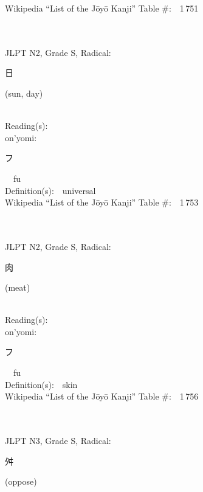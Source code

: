 \begin{multicols}{2}
Wikipedia ``List of the J\=oy\=o Kanji'' Table \#:\ \ 1\,751 \\
\ \ \\
{\fontsize{34pt}{40pt}  }\ \ \\  %
{JLPT N2, Grade S, Radical:\ \ {\begin{CJK}{UTF8}{min} 日 \end{CJK}} (sun, day) } \\
Reading(s):\ \ \\
{\hspace*{1em}}on'yomi:\ \ \\
{\hspace*{2em}}{\begin{CJK}{UTF8}{min} フ \end{CJK}}\ \ fu\ \ \\
Definition(s):\ \ universal \\
Wikipedia ``List of the J\=oy\=o Kanji'' Table \#:\ \ 1\,753 \\
\ \ \\
{\fontsize{34pt}{40pt}  }\ \ \\  %
{JLPT N2, Grade S, Radical:\ \ {\begin{CJK}{UTF8}{min} 肉 \end{CJK}} (meat) } \\
Reading(s):\ \ \\
{\hspace*{1em}}on'yomi:\ \ \\
{\hspace*{2em}}{\begin{CJK}{UTF8}{min} フ \end{CJK}}\ \ fu\ \ \\
Definition(s):\ \ skin \\
Wikipedia ``List of the J\=oy\=o Kanji'' Table \#:\ \ 1\,756 \\
\ \ \\
{\fontsize{34pt}{40pt}  }\ \ \\  %
{JLPT N3, Grade S, Radical:\ \ {\begin{CJK}{UTF8}{min} 舛 \end{CJK}} (oppose) } \\

\end{multicols}
